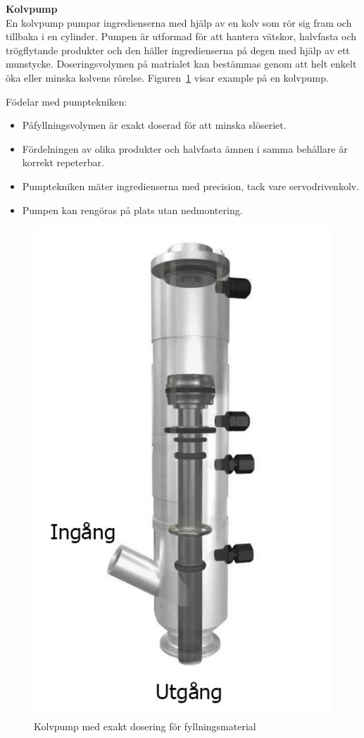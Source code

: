 \textbf{Kolvpump}\\
En kolvpump pumpar ingredienserna med hjälp av en kolv som rör sig fram och tillbaka i en cylinder. Pumpen är utformad för att hantera vätskor, halvfasta och trögflytande produkter och den häller ingredienserna på degen med hjälp av ett munstycke. Doseringsvolymen på matrialet kan bestämmas genom att helt enkelt öka eller minska kolvens rörelse. Figuren~\ref{kolvpump} visar example på en kolvpump.

Födelar med pumptekniken:
\begin{itemize}
	\item Påfyllningsvolymen är exakt doserad för att minska slöseriet.
	\item Fördelningen av olika produkter och halvfasta ämnen i samma behållare är korrekt repeterbar.
	\item Pumptekniken mäter ingredienserna med precision, tack vare servodrivenkolv.
	\item Pumpen kan rengöras på plats utan nedmontering.
\end{itemize}

\begin{figure}[h]
	\begin{center}
		\includegraphics[scale=0.5]{images/maxresdefault.jpg}
		\caption{Kolvpump med exakt dosering för fyllningsmaterial~\cite{Dosering pump}}
		\label{kolvpump}	
	\end{center}
\end{figure}

